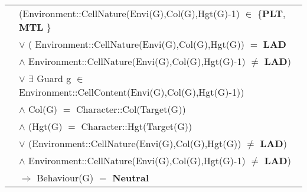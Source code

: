 \documentclass[8pt]{article}
\begin{document}
{\begin{longtable}{rl}
  & (\textrm{Environment::CellNature(Envi(G),Col(G),Hgt(G)-1)} $\in$ \{\textbf{PLT}, \textbf{MTL}  \} \\
  & \quad\quad\quad\quad $\lor$ ( \textrm{Environment::CellNature(Envi(G),Col(G),Hgt(G))} $=$ \textbf{LAD} \\
  & \quad\quad\quad\quad\quad\quad $\land$ \textrm{Environment::CellNature(Envi(G),Col(G),Hgt(G)-1)} $\neq$ \textbf{LAD}) \\
  & \quad\quad\quad\quad $\lor$ $\exists$ \textrm{Guard} g $\in$ \textrm{Environment::CellContent(Envi(G),Col(G),Hgt(G)-1)}) \\
  & \quad\quad $\land$ \textrm{Col(G)} $=$ \textrm{Character::Col(Target(G))} \\
  & \quad\quad $\land$ (\textrm{Hgt(G)} $=$ \textrm{Character::Hgt(Target(G))} \\
  & \quad\quad\quad\quad $\lor$ (\textrm{Environment::CellNature(Envi(G),Col(G),Hgt(G))} $\neq$ \textbf{LAD})\\
  & \quad\quad\quad\quad\quad\quad $\land$ \textrm{Environment::CellNature(Envi(G),Col(G),Hgt(G)-1)} $\neq$ \textbf{LAD}) \\
  & \quad\quad $\Rightarrow$ \textrm{Behaviour(G)} $=$ \textbf{Neutral} \\
\end{longtable}}
\end{document}
